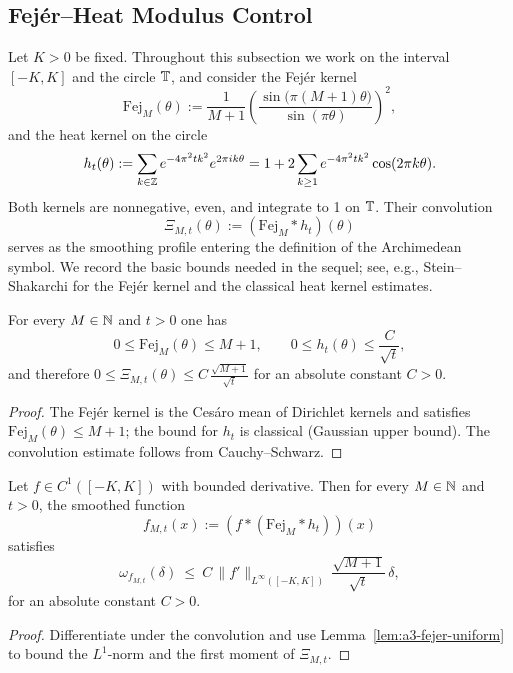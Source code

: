 
\subsection{Fej\'er--Heat Modulus Control}\label{subsec:a3-fejer-modulus}
Let $K>0$ be fixed. Throughout this subsection we work on the interval $[-K,K]$ and the circle $\mathbb T$, and consider the Fej\'er kernel
\[
  \mathrm{Fej}_M(\theta) := \frac{1}{M+1} \left( \frac{\sin\big(\pi(M+1)\theta\big)}{\sin(\pi\theta)} \right)^2,
\]
and the heat kernel on the circle
\[
  h_t(\theta) := \sum_{k\in\mathbb Z} e^{-4\pi^2 t k^2} e^{2\pi i k\theta} = 1 + 2\sum_{k\ge1} e^{-4\pi^2 t k^2} \cos(2\pi k\theta).
\]
Both kernels are nonnegative, even, and integrate to 1 on $\mathbb T$. Their convolution
\[
  \Xi_{M,t}(\theta) := (\mathrm{Fej}_M * h_t)(\theta)
\]
serves as the smoothing profile entering the definition of the Archimedean symbol. We record the basic bounds needed in the sequel; see, e.g., Stein--Shakarchi \cite[Ch.~2]{SteinShakarchi2003} for the Fej\'er kernel and the classical heat kernel estimates.

\begin{lemma}\label{lem:a3-fejer-uniform}
For every $M\in\mathbb N$ and $t>0$ one has
\[
  0 \le \mathrm{Fej}_M(\theta) \le M+1,\qquad
  0 \le h_t(\theta) \le \frac{C}{\sqrt{t}},
\]
and therefore $0 \le \Xi_{M,t}(\theta) \le C \,\frac{\sqrt{M+1}}{\sqrt{t}}$ for an absolute constant $C>0$.
\end{lemma}

\begin{proof}
The Fej\'er kernel is the Ces\'aro mean of Dirichlet kernels and satisfies $\mathrm{Fej}_M(\theta) \le M+1$; the bound for $h_t$ is classical (Gaussian upper bound). The convolution estimate follows from Cauchy--Schwarz.
\end{proof}

\begin{lemma}\label{lem:a3-fejer-lip}
Let $f \in C^1([-K,K])$ with bounded derivative. Then for every $M\in\mathbb N$ and $t>0$, the smoothed function
\[
  f_{M,t}(x) := (f * (\mathrm{Fej}_M * h_t))(x)
\]
satisfies
\[
  \omega_{f_{M,t}}(\delta) \ \le\ C\,\|f'\|_{L^\infty([-K,K])}\,\frac{\sqrt{M+1}}{\sqrt{t}}\,\delta,
\]
for an absolute constant $C>0$.
\end{lemma}
\begin{proof}
Differentiate under the convolution and use Lemma~\ref{lem:a3-fejer-uniform} to bound the $L^1$-norm and the first moment of $\Xi_{M,t}$.
\end{proof}

